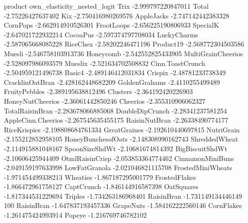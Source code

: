 product	own_elasticity_nested_logit
Trix	-2.999797220847011
Total	-2.75226427637402
Kix	-2.750416980269576
AppleJacks	-2.747142442383328
CornPops	-2.662914910526301
FrootLoops	-2.656225190806933
SpecialK	-2.647021722932214
CocoaPus	-2.597374797708034
LuckyCharms	-2.587065668085228
RiceChex	-2.58202246471196
Product19	-2.568772304503586
Muesli	-2.546758103913736
Honeycomb	-2.542552825433905
MultiGrainCheerios	-2.528097986093579
Mueslix	-2.521634702508832
Cinn.ToastCrunch	-2.504959121496738
Basic4	-2.489146412031834
Crispix	-2.48781233738349
CracklinOatBran	-2.428162448682209
GoldenGrahams	-2.4110255499489
FruityPebbles	-2.389195638812496
Clusters	-2.364192420226903
HoneyNutCheerios	-2.36061442850246
Cheerios	-2.355310906062327
TotalRaisinBran	-2.283678066885068
DoubleDipCrunch	-2.28341237581254
AppleCinn.Cheerios	-2.267545635455175
RaisinNutBran	-2.26338490774177
RiceKrispies	-2.198808684761334
GreatGraines	-2.192610440697815
NutriGrain	-2.155212852958105
HoneyBunchesofOats	-2.148308990162743
ShreddedWheat	-2.114915881048167
SpoonSizeShdWt	-2.10681674814392
BigBiscuitShdWt	-2.10606425944409
OtmlRaisinCrisp	-2.053853364774462
CinnamonMiniBuns	-2.049159197633998
LowFatGranola	-2.021046821115708
FrostedMiniWheats	-1.971454499338213
Wheaties	-1.867187295001779
FrostedFlakes	-1.866472961758127
CaptCrunch	-1.846144916587398
OatSquares	-1.817344531229694
Triples	-1.734263186968401
RaisinBran	-1.731149134446149
100%
RaisinBran	-1.647837193457336
GrapeNuts	-1.584162222560146
CornFlakes	-1.261475424993914
Popeye	-1.216769746782102
